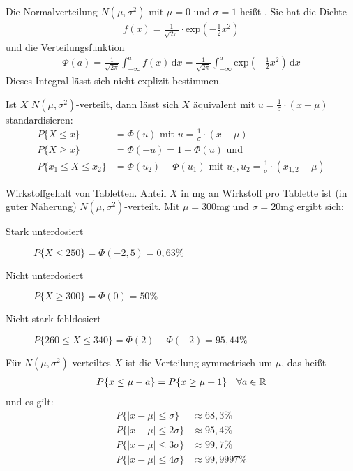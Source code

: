 Die Normalverteilung $N(\mu, \sigma^2)$ mit $\mu = 0$ und $\sigma = 1$ heißt . Sie hat die Dichte
\begin{align*}
    f(x) = \frac{1}{\sqrt{2 \pi}} \cdot \text{exp}\left(-\frac{1}{2} x^2\right)
\end{align*}
und die Verteilungsfunktion
\begin{align*}
    \Phi (a) = \frac{1}{\sqrt{2 \pi}} \int_{-\infty}^a \! f(x) \, \mathrm{d}x = \frac{1}{\sqrt{2 \pi}} \int_{-\infty}^a \! \text{exp}\left(-\frac{1}{2} x^2\right) \, \mathrm{d}x
\end{align*}
Dieses Integral lässt sich nicht explizit bestimmen.

Ist $X$ $N(\mu, \sigma ^2)$-verteilt, dann lässt sich $X$ äquivalent mit $u = \frac{1}{\sigma} \cdot (x - \mu)$ standardisieren:
\begin{align*}
    P\{X \leq x\} &= \Phi(u) \text{ mit } u = \frac{1}{\sigma} \cdot (x - \mu) \\
    P\{X \geq x\} &= \Phi(-u) = 1 - \Phi(u) \text{ und} \\
    P\{x_1 \leq X \leq x_2\} &= \Phi(u_2) - \Phi(u_1) \text{ mit } u_1, u_2 = \frac{1}{\sigma} \cdot (x_{1, 2} - \mu)
\end{align*}

Wirkstoffgehalt von Tabletten. Anteil $X$ in mg an Wirkstoff pro Tablette ist (in guter Näherung) $N(\mu, \sigma ^2)$-verteilt. Mit $\mu = 300\text{mg}$ und $\sigma = 20\text{mg}$ ergibt sich:
\begin{description}
    \item[Stark unterdosiert]{$P\{X \leq 250\} = \Phi(-2,5) = 0,63\%{}$}
    \item[Nicht unterdosiert]{$P\{X \geq 300\} = \Phi(0) = 50\%{}$}
    \item[Nicht stark fehldosiert]{$P\{260 \leq X \leq 340\} = \Phi(2) - \Phi(-2) = 95,44\%{}$}
\end{description}

Für $N(\mu, \sigma ^2)$-verteiltes $X$ ist die Verteilung symmetrisch um $\mu$, das heißt
\begin{align*}
    P\{x \leq \mu - a\} = P\{x \geq \mu + 1\} \quad \forall a \in \mathbb{R}
\end{align*}
und es gilt:
\begin{align*}
    P\{|x - \mu| \leq \sigma\} &\approx 68,3\%{} \\
    P\{|x - \mu| \leq 2 \sigma\} &\approx 95,4\%{} \\
    P\{|x - \mu| \leq 3 \sigma\} &\approx 99,7\%{} \\
    P\{|x - \mu| \leq 4 \sigma\} &\approx 99,9997\%{}
\end{align*}

